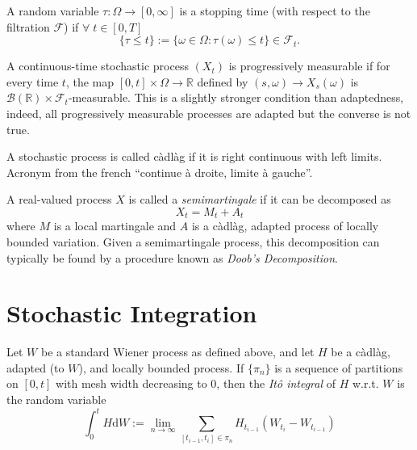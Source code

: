 \begin{definition}
    A random variable $\tau:\Omega\rightarrow[0,\infty]$ is a stopping time (with
    respect to the filtration $\mathcal{F}$) if $\forall\;t\in[0,T]$
    \begin{equation}
        \{\tau\leq t\}:=\{\omega\in\Omega:\tau(\omega)\leq t\}\in\mathcal{F}_t.
    \end{equation}

\end{definition}

\begin{definition}
    A continuous-time stochastic process $(X_t)$ is progressively measurable if
    for every time $t$, the map $[0,t]\times\Omega\rightarrow\mathbb{R}$ defined
    by $(s,\omega)\rightarrow X_s(\omega)$ is $\mathcal{B}(\mathbb{R})\times\mathcal{F}_t$-measurable.
    This is a slightly stronger condition than adaptedness, indeed, all progressively
    measurable processes are adapted but the converse is not true. 
\end{definition}

\begin{definition}[C\`{a}dl\`{a}g process]
    A stochastic process is called c\`{a}dl\`{a}g if it is right continuous with left 
    limits. Acronym from the french ``continue \`{a} droite, limite \`{a} gauche''.
\end{definition}

\begin{definition}[Semimartingale]
    A real-valued process $X$ is called a \emph{semimartingale} if it can be decomposed as
    \begin{equation}
        X_t = M_t + A_t
    \end{equation}
    where $M$ is a local martingale and $A$ is a c\`{a}dl\`{a}g, adapted process of locally
    bounded variation. Given a semimartingale process, this decomposition can typically 
    be found by a procedure known as \emph{Doob's Decomposition}.
\end{definition}

\section{Stochastic Integration}

\begin{definition}
    Let $W$ be a standard Wiener process as defined above, and let $H$ be a c\`{a}dl\`{a}g,
    adapted (to $W$), and locally bounded process. If $\{\pi_n\}$ is a sequence of partitions
    on $[0,t]$ with mesh width decreasing to $0$, then the \emph{It\^{o} integral} of $H$
    w.r.t. $W$ is the random variable
    \begin{equation}
        \int_0^tH\mathrm dW:=\lim_{n\rightarrow\infty}\sum_{[t_{i-1},t_i]\in\pi_n}H_{t_{i-1}}(W_{t_i}-W_{t_{i-1}})
    \end{equation}
\end{definition}

